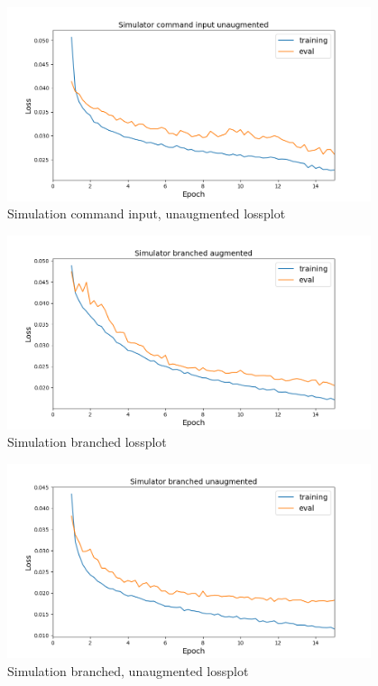 \documentclass[a4paper]{article}
\begin{document}
\begin{figure}[!htbp]
  \centering
  \includegraphics[width=0.95\textwidth]{figures/sim_command_input_nonaug_lossplot}
  \caption{Simulation command input, unaugmented lossplot}
  \label{fig:unaugmented_command_loss}
\end{figure}
\begin{figure}[!htbp]
  \centering
  \includegraphics[width=0.95\textwidth]{figures/sim_branched_aug_lossplot}
  \caption{Simulation branched lossplot}
  \label{fig:augmented_branched_loss}
\end{figure}
\begin{figure}[!htbp]
  \centering
  \includegraphics[width=0.95\textwidth]{figures/sim_branched_nonaug_lossplot}
  \caption{Simulation branched, unaugmented lossplot}
  \label{fig:unaugmented_branched_loss}
\end{figure}
\end{document}
